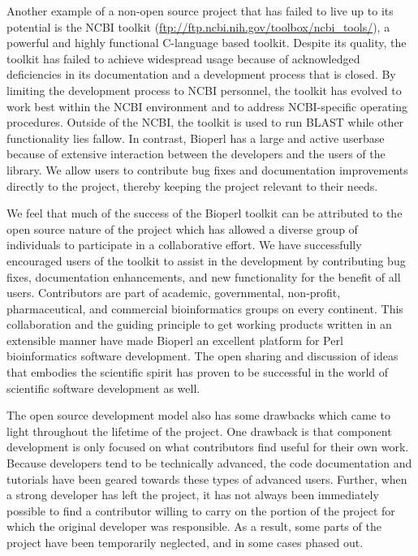 \documentclass[12pt]{article}
\begin{document}
Another example of a non-open source project that has failed to live
up to its potential is the NCBI toolkit
(\url{ftp://ftp.ncbi.nih.gov/toolbox/ncbi_tools/}), a powerful and
highly functional C-language based toolkit.  Despite its quality, the
toolkit has failed to achieve widespread usage because of acknowledged
deficiencies in its documentation and a development process that is
closed.  By limiting the development process to NCBI personnel, the
toolkit has evolved to work best within the NCBI environment and to
address NCBI-specific operating procedures.  Outside of the NCBI, the
toolkit is used to run BLAST while other functionality lies fallow.
In contrast, Bioperl has a large and active userbase because of
extensive interaction between the developers and the users of the
library.  We allow users to contribute bug fixes and documentation
improvements directly to the project, thereby keeping the project
relevant to their needs.

We feel that much of the success of the Bioperl toolkit can be
attributed to the open source nature of the project which has allowed
a diverse group of individuals to participate in a collaborative effort.
We have successfully encouraged users of the toolkit to assist in the
development by contributing bug fixes, documentation enhancements, and
new functionality for the benefit of all users.  Contributors are part
of academic, governmental, non-profit, pharmaceutical, and
commercial bioinformatics groups on every continent.  This collaboration and
the guiding principle to get working products written in an extensible
manner have made Bioperl an excellent platform for Perl bioinformatics
software development.  The open sharing and discussion of ideas that
embodies the scientific spirit has proven to be successful in the
world of scientific software development as well.  


The open source development model also has some drawbacks which came
to light throughout the lifetime of the project.  One drawback is that
component development is only focused on what contributors find useful
for their own work.  Because developers tend to be technically
advanced, the code documentation and tutorials have been geared
towards these types of advanced users.  Further, when a
strong developer has left the project, it has not always been
immediately possible to find a contributor willing to carry on the
portion of the project for which the original developer was
responsible.  As a result, some parts of the project have been
temporarily neglected, and in some cases phased out.
\end{document}
